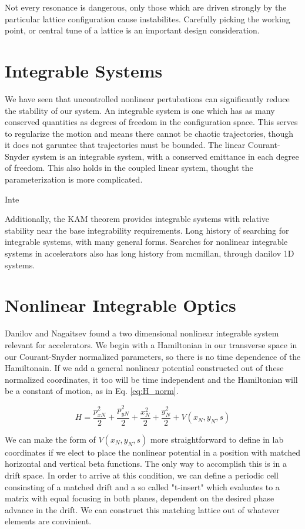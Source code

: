 Not every resonance is dangerous, only those which are driven strongly by the particular lattice configuration cause instabilites. Carefully picking the working point, or central tune of a lattice is an important design consideration.

\section{Integrable Systems} \label{sec:integral}
We have seen that uncontrolled nonlinear pertubations can significantly reduce the stability of our system. An integrable system is one which has as many conserved quantities as degrees of freedom in the configuration space. This serves to regularize the motion and means there cannot be chaotic trajectories, though it does not garuntee that trajectories must be bounded. The linear Courant-Snyder system is an integrable system, with a conserved emittance in each degree of freedom. This also holds in the coupled linear system, thought the parameterization is more complicated. 

Inte


Additionally, the KAM theorem provides integrable systems with relative stability near the base integrability requirements.
Long history of searching for integrable systems, with many general forms.
Searches for nonlinear integrable systems in accelerators also has long history from mcmillan, through danilov 1D systems.

\section{Nonlinear Integrable Optics} \label{sec:nio}
Danilov and Nagaitsev found a two dimensional nonlinear integrable system relevant for accelerators.
We begin with a Hamiltonian in our transverse space in our Courant-Snyder normalized parameters, so there is no time dependence of the Hamiltonain.  If we add a general nonlinear potential constructed out of these normalized coordinates, it too will be time independent and the Hamiltonian will be a constant of motion, as in Eq. \ref{eq:H_norm}.

\begin{equation} \label{eq:H_norm}
	H = \frac{p_{xN}^2}{2} + \frac{p_{yN}^2}{2}  + \frac{x_{N}^2}{2} + \frac{y_{N}^2}{2} + V(x_N,y_N,s)
\end{equation}

We can make the form of $V(x_N,y_N,s)$ more straightforward to define in lab coordinates if we elect to place the nonlinear potential in a position with matched horizontal and vertical beta functions. The only way to accomplish this is in a drift space. In order to arrive at this condition, we can define a periodic cell consinsting of a matched drift and a so called "t-insert" which evaluates to a matrix with equal focusing in both planes, dependent on the desired phase advance in the drift. We can construct this matching lattice out of whatever elements are convinient. 

